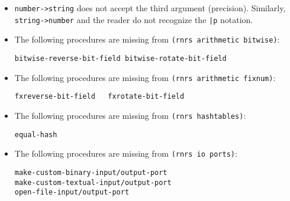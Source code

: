 \documentclass[onecolumn, 12pt, twoside, openright, dvipdfm]{book}
\begin{document}
\begin{itemize}
\item \texttt{number->string} does not accept the third argument
(precision).  Similarly, \texttt{string->number} and the reader do
not recognize the \texttt{|p} notation. 


\item The following procedures are missing from \texttt{(rnrs arithmetic
bitwise)}:
\begin{Verbatim}
bitwise-reverse-bit-field bitwise-rotate-bit-field 
\end{Verbatim}

\item The following procedures are missing from \texttt{(rnrs arithmetic
fixnum)}:
\begin{Verbatim}
fxreverse-bit-field   fxrotate-bit-field   
\end{Verbatim}


\item The following procedures are missing from \texttt{(rnrs hashtables)}:
\begin{Verbatim}
equal-hash
\end{Verbatim}

\item The following procedures are missing from \texttt{(rnrs io ports)}:
\begin{Verbatim}
make-custom-binary-input/output-port    
make-custom-textual-input/output-port 
open-file-input/output-port
\end{Verbatim}

\end{itemize}



\nocite{ghuloum-implicit}
\nocite{ghuloum-generation}

\newpage
\backmatter
\appendix
{}


\newpage
{}
{}
\printindex
\end{document}
